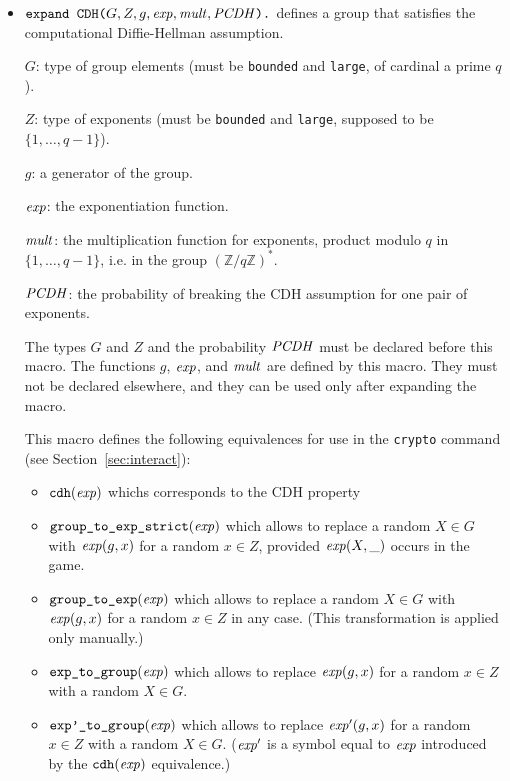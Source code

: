 \documentclass{article}
\begin{document}
\begin{itemize}
\item $\texttt{expand\ CDH(}G, Z, g, \mathit{exp}, \mathit{mult},
  \mathit{PCDH}\texttt{).}$ defines a group that satisfies the computational
  Diffie-Hellman assumption.

   $G$: type of group elements (must be \texttt{bounded} and \texttt{large}, of cardinal a prime $q$).

   $Z$: type of exponents (must be \texttt{bounded} and \texttt{large}, 
   supposed to be $\{1, \ldots, q-1\}$).

   $g$: a generator of the group.

   $\mathit{exp}$: the exponentiation function.

   $\mathit{mult}$: the multiplication function for exponents, product modulo $q$ in
   $\{1, \ldots, q-1\}$, i.e. in the group $(\mathbb{Z}/q\mathbb{Z})^*$.

   $\mathit{PCDH}$: the probability of breaking the CDH assumption for one pair of
   exponents.

   The types $G$ and $Z$ and the probability $\mathit{PCDH}$ must be
   declared before this macro.  The functions $g$, $\mathit{exp}$, and
   $\mathit{mult}$ are defined by this macro. They must not be declared
   elsewhere, and they can be used only after expanding the macro.

   This macro defines the following equivalences for use in the
   \texttt{crypto} command (see Section~\ref{sec:interact}):
\begin{itemize}
\item $\texttt{cdh}(\mathit{exp})$ whichs corresponds to the CDH property
\item $\texttt{group\_to\_exp\_strict}(\mathit{exp})$ which allows to replace
a random $X \in G$ with $\mathit{exp}(g,x)$ for a random $x \in Z$, provided
$\mathit{exp}(X,\_)$ occurs in the game.
\item $\texttt{group\_to\_exp}(\mathit{exp})$ which allows to replace
a random $X \in G$ with $\mathit{exp}(g,x)$ for a random $x \in Z$ in any case.
(This transformation is applied only manually.)
\item $\texttt{exp\_to\_group}(\mathit{exp})$ which allows to replace
$\mathit{exp}(g,x)$ for a random $x \in Z$ with a random $X \in G$.
\item $\texttt{exp'\_to\_group}(\mathit{exp})$ which allows to replace
$\mathit{exp'}(g,x)$ for a random $x \in Z$ with a random $X \in G$.
($\mathit{exp'}$ is a symbol equal to $\mathit{exp}$ introduced by the
$\texttt{cdh}(\mathit{exp})$ equivalence.)
\end{itemize}


\end{itemize}
\end{document}
